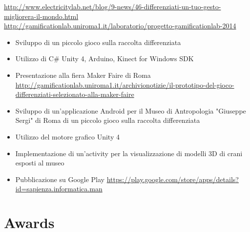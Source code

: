 \documentclass[11pt,a4paper,sans]{moderncv} %
\begin{document}
{
	\url{http://www.electricitylab.net/blog/9-news/46-differenziati-un-tuo-gesto-migliorera-il-mondo.html}
	\newline{}
	\url{http://gamificationlab.uniroma1.it/laboratorio/progetto-gamificationlab-2014}
	\begin{itemize}
		\item Sviluppo di un piccolo gioco sulla raccolta differenziata
		\item Utilizzo di C\# Unity 4, Arduino, Kinect for Windows SDK
		\item Presentazione alla fiera Maker Faire di Roma
		\newline{} \url{http://gamificationlab.uniroma1.it/archivionotizie/il-prototipo-del-gioco-differenziati-selezionato-alla-maker-faire}
	\end{itemize}
}



{
	\begin{itemize}
		\item Sviluppo di un'applicazione Android per il Museo di Antropologia "Giuseppe Sergi" di Roma di un piccolo gioco sulla raccolta differenziata
		\item Utilizzo del motore grafico Unity 4
		\item Implementazione di un'activity per la visualizzazione di modelli 3D di crani esposti al museo
		\item Pubblicazione su Google Play
		\newline{}
		\url{https://play.google.com/store/apps/details?id=sapienza.informatica.man}
	\end{itemize}
}

\section{Awards}


\end{document}

